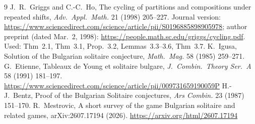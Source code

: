 \documentclass[11pt]{article}
\begin{document}
\begin{thebibliography}{9}
 J.~R.~Griggs and C.-C.~Ho, The cycling of partitions and compositions under repeated shifts, \emph{Adv.\ Appl.\ Math.} 21 (1998) 205--227. Journal version: \url{https://www.sciencedirect.com/science/article/pii/S0196885898905978}; author preprint (dated Mar.~2, 1998): \url{https://people.math.sc.edu/griggs/cycling.pdf}. Used: Thm~2.1, Thm~3.1, Prop.~3.2, Lemmas~3.3--3.6, Thm~3.7.
 K.~Igusa, Solution of the Bulgarian solitaire conjecture, \emph{Math.\ Mag.} 58 (1985) 259--271.
 G.~Etienne, Tableaux de Young et solitaire bulgare, \emph{J.\ Combin.\ Theory Ser.\ A} 58 (1991) 181--197. \url{https://www.sciencedirect.com/science/article/pii/009731659190059P}
 H.-J.~Bentz, Proof of the Bulgarian Solitaire conjectures, \emph{Ars Combin.} 23 (1987) 151--170.
 R.~Mestrovic, A short survey of the game Bulgarian solitaire and related games, arXiv:2607.17194 (2026). \url{https://arxiv.org/html/2607.17194}
\end{thebibliography}
\end{document}
